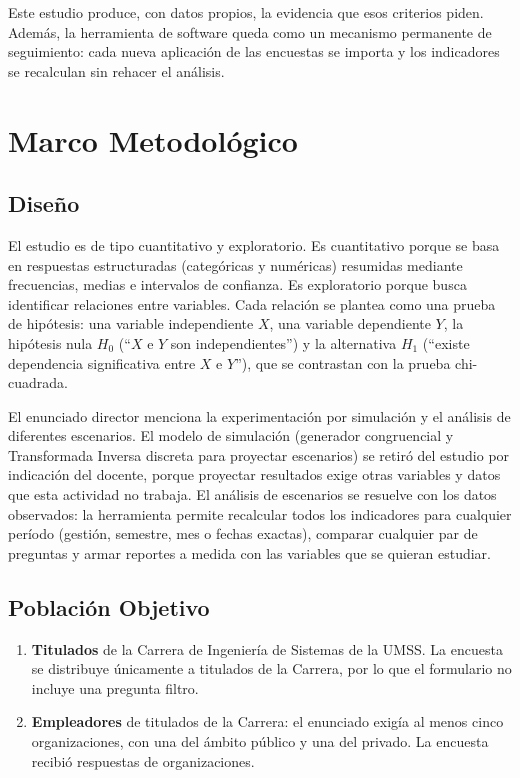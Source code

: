 \documentclass[12pt, a4paper]{article}
\begin{document}
Este estudio produce, con datos propios, la evidencia que esos criterios
piden. Además, la herramienta de software queda como un mecanismo
permanente de seguimiento: cada nueva aplicación de las encuestas se
importa y los indicadores se recalculan sin rehacer el análisis.

\section{Marco Metodológico}

\subsection{Diseño}

El estudio es de tipo cuantitativo y exploratorio. Es cuantitativo
porque se basa en respuestas estructuradas (categóricas y numéricas)
resumidas mediante frecuencias, medias e intervalos de confianza. Es
exploratorio porque busca identificar relaciones entre variables. Cada
relación se plantea como una prueba de hipótesis: una variable
independiente $X$, una variable dependiente $Y$, la hipótesis nula
$H_0$ (``$X$ e $Y$ son independientes'') y la alternativa $H_1$
(``existe dependencia significativa entre $X$ e $Y$''), que se contrastan
con la prueba chi-cuadrada.

El enunciado director menciona la experimentación por simulación y el
análisis de diferentes escenarios. El modelo de simulación (generador
congruencial y Transformada Inversa discreta para proyectar escenarios)
se retiró del estudio por indicación del docente, porque proyectar
resultados exige otras variables y datos que esta actividad no trabaja.
El análisis de escenarios se resuelve con los datos observados: la
herramienta permite recalcular todos los indicadores para cualquier
período (gestión, semestre, mes o fechas exactas), comparar cualquier
par de preguntas y armar reportes a medida con las variables que se
quieran estudiar.

\subsection{Población Objetivo}

\begin{enumerate}
  \item \textbf{Titulados} de la Carrera de Ingeniería de Sistemas de la
  UMSS. La encuesta se distribuye únicamente a titulados de la Carrera,
  por lo que el formulario no incluye una pregunta filtro.
  \item \textbf{Empleadores} de titulados de la Carrera: el enunciado
  exigía al menos cinco organizaciones, con una del ámbito público y una
  del privado. La encuesta recibió respuestas de \nEmpleadores{} organizaciones.
\end{enumerate}
\end{document}

